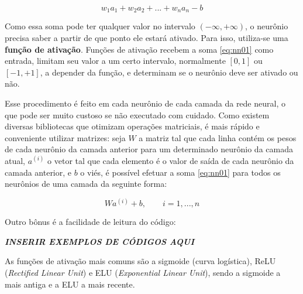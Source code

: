 \begin{equation} \label{eq:nn01}
w_{1}a_{1} + w_{2}a_{2} + ... + w_{n}a_{n} - b
\end{equation}

Como essa soma pode ter qualquer valor no intervalo $(-\infty, +\infty)$, o neurônio precisa saber a partir de que ponto ele estará ativado. Para isso, utiliza-se uma \textbf{função de ativação}. Funções de ativação recebem a soma \ref{eq:nn01} como entrada, limitam seu valor a um certo intervalo, normalmente $[0, 1]$ ou $[-1, +1]$, a depender da função, e determinam se o neurônio deve ser ativado ou não.

Esse procedimento é feito em cada neurônio de cada camada da rede neural, o que pode ser muito custoso se não executado com cuidado.
Como existem diversas bibliotecas que otimizam operações matriciais, é mais rápido e conveniente utilizar matrizes: seja $W$ a matriz tal que cada linha contém os pesos de cada neurônio da camada anterior para um determinado neurônio da camada atual, $a^{(i)}$ o vetor tal que cada elemento é o valor de saída de cada neurônio da camada anterior, e $b$ o viés, é possível efetuar a soma \ref{eq:nn01} para todos os neurônios de uma camada da seguinte forma:

\begin{equation} \label{eq:nn02}
Wa^{(i)} + b, \qquad i = 1, ..., n
\end{equation}

Outro bônus é a facilidade de leitura do código:

\textit{\textbf{INSERIR EXEMPLOS DE CÓDIGOS AQUI}}

As funções de ativação mais comuns são a sigmoide (curva logística), ReLU (\textit{Rectified Linear Unit}) e ELU (\textit{Exponential Linear Unit}), sendo a sigmoide a mais antiga e a ELU a mais recente.



